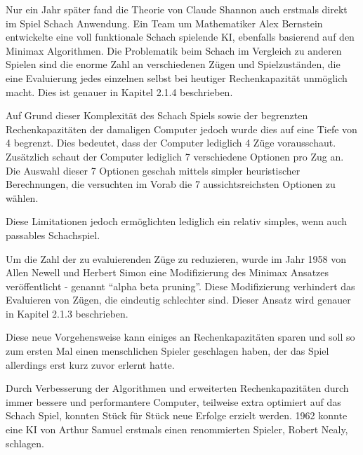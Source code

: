
Nur ein Jahr später fand die Theorie von Claude Shannon auch erstmals direkt im Spiel Schach Anwendung. Ein Team um Mathematiker Alex Bernstein entwickelte eine voll funktionale Schach spielende KI, ebenfalls basierend auf den Minimax Algorithmen. Die Problematik beim Schach im Vergleich zu anderen Spielen sind die enorme Zahl an verschiedenen Zügen und Spielzuständen, die eine Evaluierung jedes einzelnen selbst bei heutiger Rechenkapazität unmöglich macht. Dies ist genauer in Kapitel 2.1.4 beschrieben.

Auf Grund dieser Komplexität des Schach Spiels sowie der begrenzten Rechenkapazitäten der damaligen Computer jedoch wurde dies auf eine Tiefe von 4 begrenzt. Dies bedeutet, dass der Computer lediglich 4 Züge vorausschaut. Zusätzlich schaut der Computer lediglich 7 verschiedene Optionen pro Zug an. Die Auswahl dieser 7 Optionen geschah mittels simpler heuristischer Berechnungen, die versuchten im Vorab die 7 aussichtsreichsten Optionen zu wählen.


Diese Limitationen jedoch ermöglichten lediglich ein relativ simples, wenn auch passables Schachspiel.


Um die Zahl der zu evaluierenden Züge zu reduzieren, wurde im Jahr 1958 von Allen Newell und Herbert Simon eine Modifizierung des Minimax Ansatzes veröffentlicht - genannt ``alpha beta pruning''. Diese Modifizierung verhindert das Evaluieren von Zügen, die eindeutig schlechter sind. Dieser Ansatz wird genauer in Kapitel 2.1.3 beschrieben.


Diese neue Vorgehensweise kann einiges an Rechenkapazitäten sparen und soll so zum ersten Mal einen menschlichen Spieler geschlagen haben, der das Spiel allerdings erst kurz zuvor erlernt hatte.

Durch Verbesserung der Algorithmen und erweiterten Rechenkapazitäten durch immer bessere und performantere Computer, teilweise extra optimiert auf das Schach Spiel, konnten Stück für Stück neue Erfolge erzielt werden. 1962 konnte eine KI von Arthur Samuel erstmals einen renommierten Spieler, Robert Nealy, schlagen.

